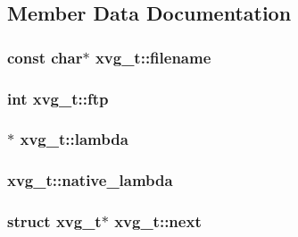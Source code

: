 \subsection{\-Member \-Data \-Documentation}
\hypertarget{structxvg__t_a3e83a65d88dcec922958a043297405fe}{
\subsubsection[{filename}]{\setlength{\rightskip}{0pt plus 5cm}const char$\ast$ {\bf xvg\-\_\-t\-::filename}}}\label{structxvg__t_a3e83a65d88dcec922958a043297405fe}
\hypertarget{structxvg__t_a17323f8c028357e369978606581732f9}{
\subsubsection[{ftp}]{\setlength{\rightskip}{0pt plus 5cm}int {\bf xvg\-\_\-t\-::ftp}}}\label{structxvg__t_a17323f8c028357e369978606581732f9}
\hypertarget{structxvg__t_ad0ce48c2b689cdd18144c5d011ef603a}{
\subsubsection[{lambda}]{$\ast$ {\bf xvg\-\_\-t\-::lambda}}}\label{structxvg__t_ad0ce48c2b689cdd18144c5d011ef603a}
\hypertarget{structxvg__t_aa8ce14829f33fd3aa4a8742f2ba389bb}{
\subsubsection[{native\-\_\-lambda}]{ {\bf xvg\-\_\-t\-::native\-\_\-lambda}}}\label{structxvg__t_aa8ce14829f33fd3aa4a8742f2ba389bb}
\hypertarget{structxvg__t_ae020288e6105d4f9dfba2ed0f4f1aec7}{
\subsubsection[{next}]{\setlength{\rightskip}{0pt plus 5cm}struct {\bf xvg\-\_\-t}$\ast$ {\bf xvg\-\_\-t\-::next}}}\label{structxvg__t_ae020288e6105d4f9dfba2ed0f4f1aec7}
